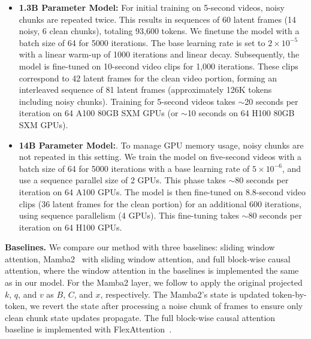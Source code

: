 \documentclass{article}
\begin{document}
\begin{itemize}
    \item \textbf{1.3B Parameter Model:} For initial training on 5-second videos, noisy chunks are repeated twice. This results in sequences of 60 latent frames (14 noisy, 6 clean chunks), totaling 93,600 tokens. We finetune the model with a batch size of 64 for 5000 iterations. The base learning rate is set to $2\times10^{-5}$ with a linear warm-up of 1000 iterations and linear decay.  Subsequently, the model is fine-tuned on 10-second video clips for 1,000 iterations. These clips correspond to 42 latent frames for the clean video portion, forming an interleaved sequence of 81 latent frames (approximately 126K tokens including noisy chunks).   Training for 5-second videos takes $\sim$20 seconds per iteration on 64 A100 80GB SXM GPUs (or $\sim$10 seconds on 64 H100 80GB SXM GPUs).
    \item  \textbf{14B Parameter Model:}. To manage GPU memory usage, noisy chunks are not repeated in this setting. We train the model on five-second videos with a batch size of 64 for 5000 iterations with a base learning rate of $5\times10^{-6}$, and use a sequence parallel size of 2 GPUs. This phase takes $\sim$80 seconds per iteration on 64 A100 GPUs. The model is then fine-tuned on 8.8-second video clips (36 latent frames for the clean portion) for an additional 600 iterations, using sequence parallelism (4 GPUs). This fine-tuning takes $\sim$80 seconds per iteration on 64 H100 GPUs.
\end{itemize}

\noindent\textbf{Baselines.}
We compare our method with three baselines: sliding window attention, Mamba2~\cite{dao2024transformers} with sliding window attention, and full block-wise causal attention, where the window attention in the baselines is implemented the same as in our model. 
For the Mamba2 layer, we follow \cite{wang2024mambainllama} to apply the original projected $k$, $q$, and $v$ as $B$, $C$, and $x$, respectively. The Mamba2's state is updated token-by-token, we revert the state after processing a noise chunk of frames to ensure only clean chunk state updates propagate.
The full block-wise causal attention baseline is implemented with FlexAttention~\cite{he2024flexattention}. 
\end{document}
